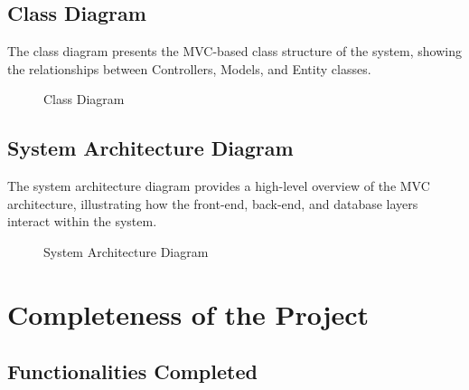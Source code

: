 \documentclass[12pt, a4paper]{report}
\begin{document}
\section{Class Diagram}

The class diagram presents the MVC-based class structure of the system, showing the relationships between Controllers, Models, and Entity classes.

\begin{figure}[H]
    \centering
    \caption{Class Diagram}
    \label{fig:class-diagram}
\end{figure}

\section{System Architecture Diagram}

The system architecture diagram provides a high-level overview of the MVC architecture, illustrating how the front-end, back-end, and database layers interact within the system.

\begin{figure}[H]
    \centering
    \caption{System Architecture Diagram}
    \label{fig:sys-arch}
\end{figure}

\chapter{Completeness of the Project}

\section{Functionalities Completed}
\end{document}
